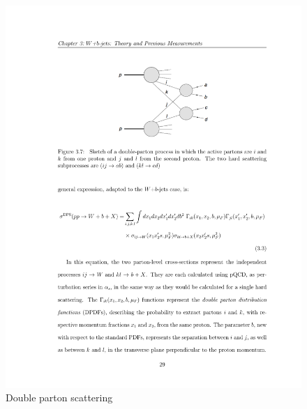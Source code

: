 \begin{figure}[htbp]
	\centering
		\includegraphics{Figures/DPS_diag.pdf}
	\caption[Double parton scattering]{Double parton scattering}
	\label{fig:DPS_diag}
\end{figure}




